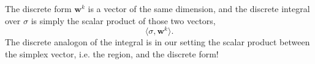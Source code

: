 The discrete form $\textbf{w}^k$ is a vector of the same dimension, and the discrete integral over $\sigma$ is simply the scalar product of those two vectors,
$$\langle \sigma , \textbf{w}^k \rangle.$$
The discrete analogon of the integral is in our setting the scalar product between the simplex vector, i.e. the region, and the discrete form!